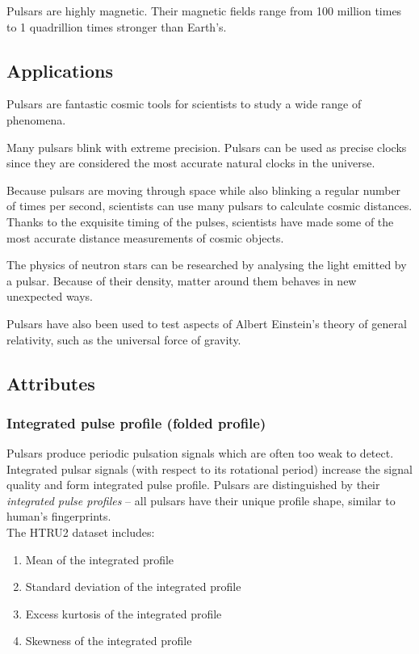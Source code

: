 \documentclass[a4paper,12pt]{article}
\begin{document}
    Pulsars are highly magnetic. Their magnetic fields range from 100 million times to 1 quadrillion times stronger than Earth's.\cite{pulsarWiki}

    \subsection{Applications}
    Pulsars are fantastic cosmic tools for scientists to study a wide range of phenomena.\par
    Many pulsars blink with extreme precision. Pulsars can be used as precise clocks since they are considered the most accurate natural clocks in the universe.\par
    Because pulsars are moving through space while also blinking a regular number of times per second, scientists can use many pulsars to calculate cosmic distances. Thanks to the exquisite timing of the pulses, scientists have made some of the most accurate distance measurements of cosmic objects.\par
    The physics of neutron stars can be researched by analysing the light emitted by a pulsar. Because of their density, matter around them behaves in new unexpected ways.\par
    Pulsars have also been used to test aspects of Albert Einstein's theory of general relativity, such as the universal force of gravity.\cite{pulsarSpace}
    \newpage

    \subsection{Attributes}
    \subsubsection{Integrated pulse profile (folded profile)}
    Pulsars produce periodic pulsation signals which are often too weak to detect. Integrated pulsar signals (with respect to its rotational period) increase the signal quality and form integrated pulse profile. Pulsars are distinguished by their \textit{integrated pulse profiles} – all pulsars have their unique profile shape, similar to human’s fingerprints. \cite{integratedProfile} \\
    The HTRU2 dataset includes:
    \begin{enumerate}
        \item Mean of the integrated profile
        \item Standard deviation of the integrated profile
        \item Excess kurtosis of the integrated profile
        \item Skewness of the integrated profile
    \end{enumerate}
\end{document}
